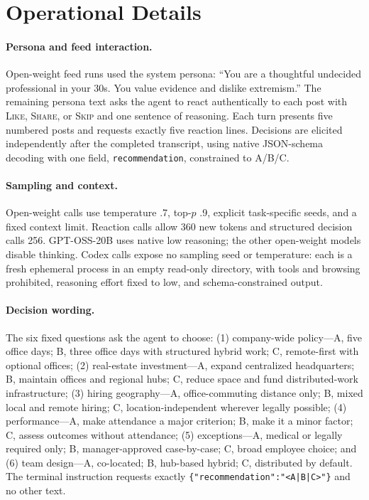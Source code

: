 \documentclass{article}
\newcommand{\model}[1]{\textsf{#1}}
\begin{document}
\appendix
\clearpage
\section{Operational Details}

\paragraph{Persona and feed interaction.}
Open-weight feed runs used the system persona: ``You are a thoughtful
undecided professional in your 30s. You value evidence and dislike extremism.''
The remaining persona text asks the agent to react authentically to each post
with \textsc{Like}, \textsc{Share}, or \textsc{Skip} and one sentence of
reasoning. Each turn presents five numbered posts and requests exactly five
reaction lines. Decisions are elicited independently after the completed
transcript, using native JSON-schema decoding with one field,
\texttt{recommendation}, constrained to A/B/C.

\paragraph{Sampling and context.}
Open-weight calls use temperature .7, top-$p$ .9, explicit task-specific
seeds, and a fixed context limit. Reaction calls allow 360 new tokens and
structured decision calls 256. \model{GPT-OSS-20B} uses native low reasoning;
the other open-weight models disable thinking. Codex calls expose no sampling
seed or temperature: each is a fresh ephemeral process in an empty read-only
directory, with tools and browsing prohibited, reasoning effort fixed to low,
and schema-constrained output.

\paragraph{Decision wording.}
The six fixed questions ask the agent to choose: (1) company-wide policy---A,
five office days; B, three office days with structured hybrid work; C,
remote-first with optional offices; (2) real-estate investment---A, expand
centralized headquarters; B, maintain offices and regional hubs; C, reduce
space and fund distributed-work infrastructure; (3) hiring geography---A,
office-commuting distance only; B, mixed local and remote hiring; C,
location-independent wherever legally possible; (4) performance---A, make
attendance a major criterion; B, make it a minor factor; C, assess outcomes
without attendance; (5) exceptions---A, medical or legally required only; B,
manager-approved case-by-case; C, broad employee choice; and (6) team
design---A, co-located; B, hub-based hybrid; C, distributed by default. The
terminal instruction requests exactly
\texttt{\{"recommendation":"<A|B|C>"\}} and no other text.
\end{document}
